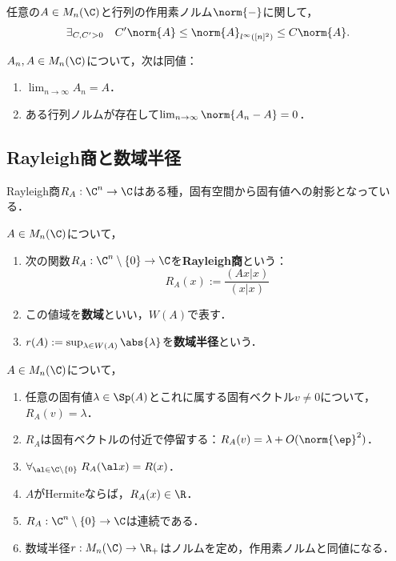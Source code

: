\documentclass[uplatex, dvipdfmx]{jsreport}
\begin{document}
\begin{theorem}[作用素ノルムの同値性]
    任意の$A\in M_n(\C)$と行列の作用素ノルム$\norm{-}$に関して，
    \[\exists_{C,C'>0}\quad C'\norm{A}\le\norm{A}_{l^\infty([n]^2)}\le C\norm{A}.\]
\end{theorem}

\begin{corollary}
    $A_n,A\in M_n(\C)$について，次は同値：
    \begin{enumerate}
        \item $\lim_{n\to\infty}A_n=A$．
        \item ある行列ノルムが存在して$\lim_{n\to\infty}\norm{A_n-A}=0$．
    \end{enumerate}
\end{corollary}

\subsection{Rayleigh商と数域半径}

\begin{tcolorbox}[colframe=ForestGreen, colback=ForestGreen!10!white,breakable,colbacktitle=ForestGreen!40!white,coltitle=black,fonttitle=\bfseries\sffamily,
title=]
    Rayleigh商$R_A:\C^n\to\C$はある種，固有空間から固有値への射影となっている．
\end{tcolorbox}

\begin{definition}
    $A\in M_n(\C)$について，
    \begin{enumerate}
        \item 次の関数$R_A:\C^n\setminus\{0\}\to\C$を\textbf{Rayleigh商}という：
        \[R_A(x):=\frac{(Ax|x)}{(x|x)}\]
        \item この値域を\textbf{数域}といい，$W(A)$で表す．
        \item $r(A):=\sup_{\lambda\in W(A)}\abs{\lambda}$を\textbf{数域半径}という．
    \end{enumerate}
\end{definition}

\begin{lemma}
    $A\in M_n(\C)$について，
    \begin{enumerate}
        \item 任意の固有値$\lambda\in\Sp(A)$とこれに属する固有ベクトル$v\ne0$について，$R_A(v)=\lambda$．
        \item $R_A$は固有ベクトルの付近で停留する：$R_A(v)=\lambda+O(\norm{\ep}^2)$．
        \item $\forall_{\al\in\C\setminus\{0\}}\;R_A(\al x)=R(x)$．
        \item $A$がHermiteならば，$R_A(x)\in\R$．
        \item $R_A:\C^n\setminus\{0\}\to\C$は連続である．
        \item 数域半径$r:M_n(\C)\to\R_+$はノルムを定め，作用素ノルムと同値になる．
    \end{enumerate}
\end{lemma}
\end{document}

